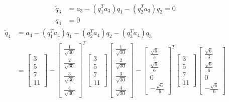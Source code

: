 \documentclass[english,onecolumn]{IEEEtran}
\begin{document}
\begin{enumerate}
\begin{align*}
    \end{align*}
    \begin{align*}
    	\tilde{q}_3 &= a_3-(q_1^Ta_3)q_1-(q_2^Ta_3)q_2=0\\
    	q_3 &= 0
    \end{align*}
    \begin{align*}
    	\tilde{q}_4 &= a_4-(q_1^Ta_4)q_1-(q_2^Ta_4)q_2-(q_3^Ta_4)q_3\\
    	&=    \begin{bmatrix}
    3\\
    5\\
    7\\
    11
    \end{bmatrix}-\begin{bmatrix}
    \frac{1}{\sqrt{30}} \\
    \frac{2}{\sqrt{30}} \\
    \frac{3}{\sqrt{30}}\\
    \frac{4}{\sqrt{30}}
    \end{bmatrix}^T    \begin{bmatrix}
    3\\
    5\\
    7\\
    11
    \end{bmatrix}\begin{bmatrix}
    \frac{1}{\sqrt{30}} \\
    \frac{2}{\sqrt{30}} \\
    \frac{3}{\sqrt{30}}\\
    \frac{4}{\sqrt{30}}
    \end{bmatrix}-\begin{bmatrix}
    \frac{\sqrt{6}}{3} \\
    \frac{\sqrt{6}}{6} \\
    0\\
    -\frac{\sqrt{6}}{6}
    \end{bmatrix}^T    \begin{bmatrix}
    3\\
    5\\
    7\\
    11
    \end{bmatrix}\begin{bmatrix}
    \frac{\sqrt{6}}{3} \\
    \frac{\sqrt{6}}{6} \\
    0\\
    -\frac{\sqrt{6}}{6}
    \end{bmatrix}\\

\end{align*}
\end{enumerate}
\end{document}

